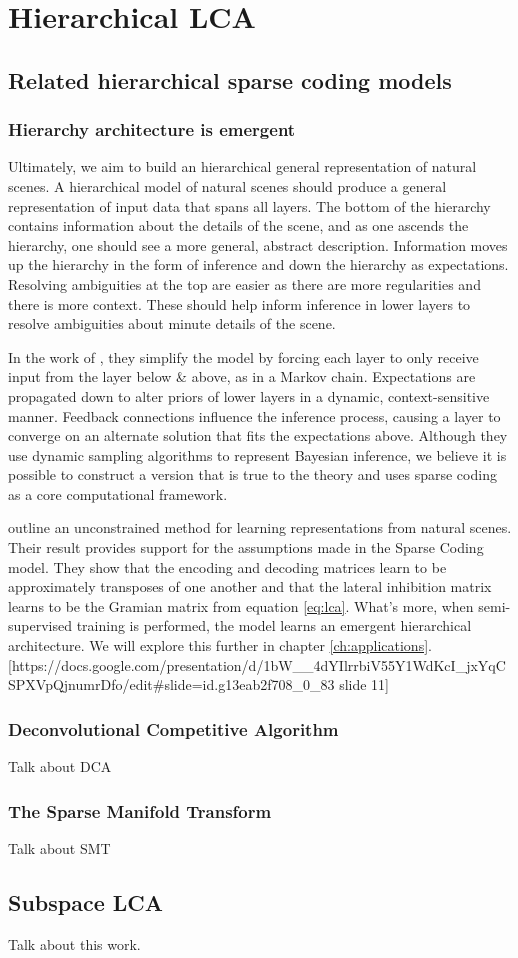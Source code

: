 \chapter{Hierarchical LCA}


\section{Related hierarchical sparse coding models}


\subsection{Hierarchy architecture is emergent}

Ultimately, we aim to build an hierarchical general representation of natural scenes. A hierarchical model of natural scenes should produce a general representation of input data that spans all layers. The bottom of the hierarchy contains information about the details of the scene, and as one ascends the hierarchy, one should see a more general, abstract description. Information moves up the hierarchy in the form of inference and down the hierarchy as expectations. Resolving ambiguities at the top are easier as there are more regularities and there is more context. These should help inform inference in lower layers to resolve ambiguities about minute details of the scene.

In the work of \citet{lee2003hierarchical}, they simplify the model by forcing each layer to only receive input from the layer below & above, as in a Markov chain. Expectations are propagated down to alter priors of lower layers in a dynamic, context-sensitive manner. Feedback connections influence the inference process, causing a layer to converge on an alternate solution that fits the expectations above. Although they use dynamic sampling algorithms to represent Bayesian inference, we believe it is possible to construct a version that is true to the theory and uses sparse coding as a core computational framework.

\citet{rolfe2013discriminative} outline an unconstrained method for learning representations from natural scenes. Their result provides support for the assumptions made in the Sparse Coding model. They show that the encoding and decoding matrices learn to be approximately transposes of one another and that the lateral inhibition matrix learns to be the Gramian matrix from equation \ref{eq:lca}. What's more, when semi-supervised training is performed, the model learns an emergent hierarchical architecture. We will explore this further in chapter \ref{ch:applications}.
[https://docs.google.com/presentation/d/1bW__4dYIlrrbiV55Y1WdKcI_jxYqCSPXVpQjnumrDfo/edit#slide=id.g13eab2f708_0_83 slide 11]


\subsection{Deconvolutional Competitive Algorithm}
Talk about DCA


\subsection{The Sparse Manifold Transform}
Talk about SMT


\section{Subspace LCA}
Talk about this work.